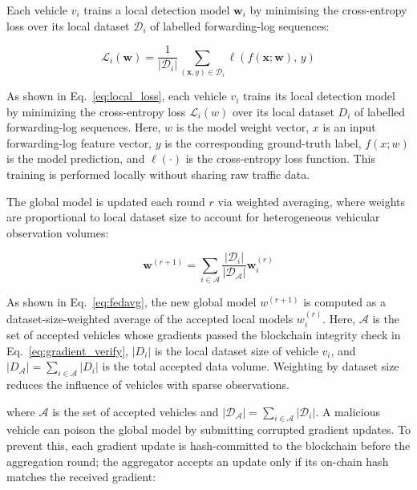 \documentclass[12pt, a4paper]{report}
\begin{document}
Each vehicle $v_i$ trains a local detection model $\mathbf{w}_i$ by minimising
the cross-entropy loss over its local dataset $\mathcal{D}_i$ of labelled
forwarding-log sequences:

\begin{equation}
\label{eq:local_loss}
\mathcal{L}_i(\mathbf{w}) = \frac{1}{|\mathcal{D}_i|}
\sum_{(\mathbf{x},y)\in\mathcal{D}_i}
\ell\!\left(f(\mathbf{x};\mathbf{w}),\, y\right)
\end{equation}

As shown in Eq.~\eqref{eq:local_loss}, each vehicle $v_i$ trains its local detection model by minimizing the cross-entropy loss $\mathcal{L}_i(w)$ over its local dataset $D_i$ of labelled forwarding-log sequences. Here, $w$ is the model weight vector, $x$ is an input forwarding-log feature vector, $y$ is the corresponding ground-truth label, $f(x; w)$ is the model prediction, and $\ell(\cdot)$ is the cross-entropy loss function. This training is performed locally without sharing raw traffic data.

The global model is updated each round $r$ via weighted averaging, where
weights are proportional to local dataset size to account for heterogeneous
vehicular observation volumes:

\begin{equation}
\label{eq:fedavg}
\mathbf{w}^{(r+1)} =
\sum_{i \in \mathcal{A}} \frac{|\mathcal{D}_i|}{|\mathcal{D}_{\mathcal{A}}|}
\mathbf{w}_i^{(r)}
\end{equation}

As shown in Eq.~\eqref{eq:fedavg}, the new global model $w^{(r+1)}$ is computed as a dataset-size-weighted average of the accepted local models $w_i^{(r)}$. Here, $\mathcal{A}$ is the set of accepted vehicles whose gradients passed the blockchain integrity check in Eq.~\eqref{eq:gradient_verify}, $|D_i|$ is the local dataset size of vehicle $v_i$, and $|D_\mathcal{A}| = \sum_{i \in \mathcal{A}} |D_i|$ is the total accepted data volume. Weighting by dataset size reduces the influence of vehicles with sparse observations.

\noindent where $\mathcal{A}$ is the set of accepted vehicles and
$|\mathcal{D}_{\mathcal{A}}| = \sum_{i\in\mathcal{A}}|\mathcal{D}_i|$.
A malicious vehicle can poison the global model by submitting corrupted
gradient updates. To prevent this, each gradient update is hash-committed
to the blockchain before the aggregation round; the aggregator accepts an
update only if its on-chain hash matches the received gradient:
\end{document}
